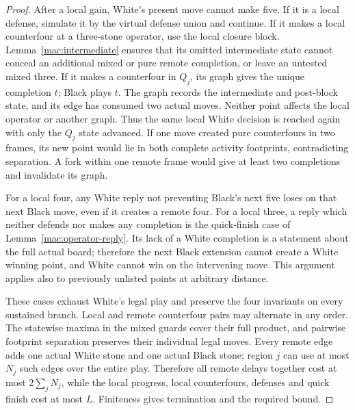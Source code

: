 \documentclass[11pt]{article}
\theoremstyle{definition}
\theoremstyle{remark}
\begin{document}
\begin{proof}
After a local gain, White's present move cannot make five. If it is a local defense, simulate it by the virtual defense union and continue. If it makes a local counterfour at a three-stone operator, use the local closure block. Lemma~\ref{mac:intermediate} ensures that its omitted intermediate state cannot conceal an additional mixed or pure remote completion, or leave an untested mixed three. If it makes a counterfour in \(Q_j\), its graph gives the unique completion \(t\); Black plays \(t\). The graph records the intermediate and post-block state, and its edge has consumed two actual moves. Neither point affects the local operator or another graph. Thus the same local White decision is reached again with only the \(Q_j\) state advanced. If one move created pure counterfours in two frames, its new point would lie in both complete activity footprints, contradicting separation. A fork within one remote frame would give at least two completions and invalidate its graph.

For a local four, any White reply not preventing Black's next five loses on that next Black move, even if it creates a remote four. For a local three, a reply which neither defends nor makes any completion is the quick-finish case of Lemma~\ref{mac:operator-reply}. Its lack of a White completion is a statement about the full actual board; therefore the next Black extension cannot create a White winning point, and White cannot win on the intervening move. This argument applies also to previously unlisted points at arbitrary distance.

These cases exhaust White's legal play and preserve the four invariants on every sustained branch. Local and remote counterfour pairs may alternate in any order. The statewise maxima in the mixed guards cover their full product, and pairwise footprint separation preserves their individual legal moves. Every remote edge adds one actual White stone and one actual Black stone; region \(j\) can use at most \(N_j\) such edges over the entire play. Therefore all remote delays together cost at most \(2\sum_jN_j\), while the local progress, local counterfours, defenses and quick finish cost at most \(L\). Finiteness gives termination and the required bound. 
\end{proof}
\end{document}
